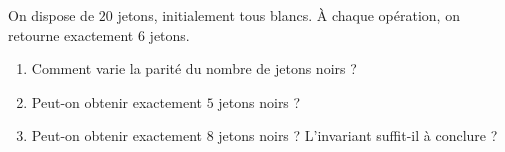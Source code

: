 On dispose de $20$ jetons, initialement tous blancs. À chaque opération, on
retourne exactement $6$ jetons.
\begin{enumerate}
  \item Comment varie la parité du nombre de jetons noirs ?
  \item Peut-on obtenir exactement $5$ jetons noirs ?
  \item Peut-on obtenir exactement $8$ jetons noirs ? L'invariant suffit-il à
  conclure ?
\end{enumerate}
